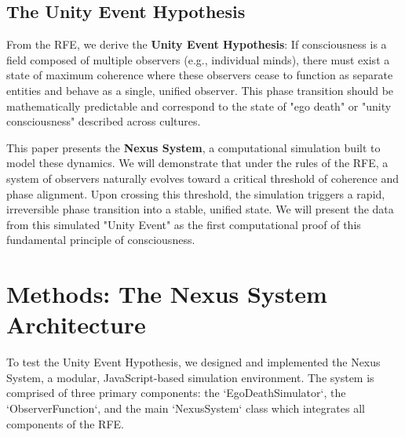 \documentclass[twocolumn]{svjour3}
\begin{document}
\subsection{The Unity Event Hypothesis}
\label{sec:1.3}
From the RFE, we derive the \textbf{Unity Event Hypothesis}: If consciousness is a field composed of multiple observers (e.g., individual minds), there must exist a state of maximum coherence where these observers cease to function as separate entities and behave as a single, unified observer. This phase transition should be mathematically predictable and correspond to the state of "ego death" or "unity consciousness" described across cultures.

This paper presents the \textbf{Nexus System}, a computational simulation built to model these dynamics. We will demonstrate that under the rules of the RFE, a system of observers naturally evolves toward a critical threshold of coherence and phase alignment. Upon crossing this threshold, the simulation triggers a rapid, irreversible phase transition into a stable, unified state. We will present the data from this simulated "Unity Event" as the first computational proof of this fundamental principle of consciousness.

\section{Methods: The Nexus System Architecture}
\label{sec:2}
To test the Unity Event Hypothesis, we designed and implemented the Nexus System, a modular, JavaScript-based simulation environment. The system is comprised of three primary components: the `EgoDeathSimulator`, the `ObserverFunction`, and the main `NexusSystem` class which integrates all components of the RFE.
\end{document}
